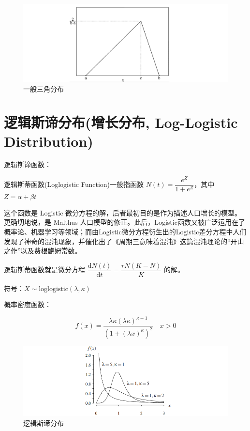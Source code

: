 \documentclass[12pt, a4paper, oneside]{ctexbook}
\begin{document}
\begin{figure}[H]
  \centering
  \includegraphics[width=1\textwidth]{image/三角分布进阶.png}
  \caption{一般三角分布}
  \label{fig:example}
\end{figure}

\section{逻辑斯谛分布(增长分布, Log-Logistic Distribution)}

 逻辑斯谛函数：

逻辑斯蒂函数(Loglogistic Function)一般指函数 $N(t) = \dfrac{e^{Z}}{1 + e^{Z}}$，其中 $Z = \alpha + \beta t$

这个函数是 Logistic 微分方程的解，后者最初目的是作为描述人口增长的模型。更确切地说，是 Malthus 人口模型的修正。此后，Logistic函数又被广泛运用在了概率论、机器学习等领域；而由Logistic微分方程衍生出的Logistic差分方程中人们发现了神奇的混沌现象，并催化出了《周期三意味着混沌》这篇混沌理论的“开山之作”以及费根鲍姆常数。

逻辑斯蒂函数就是微分方程 $\dfrac{\mathrm{d}N(t)}{\mathrm{d}t}= \dfrac{rN(K - N)}{K}$ 的解。

 符号：$X \sim \text{loglogistic}(\lambda, \kappa)$

 概率密度函数：

$$
f(x) = \dfrac{\lambda\kappa(\lambda\kappa)^{\kappa - 1}}{(1 + (\lambda x)^{\kappa})^{2}} \quad x > 0
$$

\begin{figure}[H]
  \centering
  \includegraphics[width=1\textwidth]{image/逻辑斯谛分布.png}
  \caption{逻辑斯谛分布}
  \label{fig:example}
\end{figure}
\end{document}
